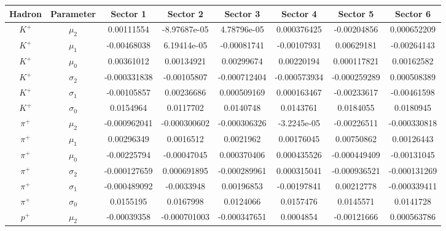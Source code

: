 \begin{landscape}
  \begin{table}
  \begin{tabular}{c|c|c|c|c|c|c|c}
    Hadron & Parameter & Sector 1 & Sector 2 & Sector 3 & Sector 4 & Sector 5 & Sector 6 \\
    \hline 
      $K^+$ & $\mu_2$ & 0.00111554 & -8.97687e-05 &        4.78796e-05 &        0.000376425 &        -0.00204856 &        0.000652209 \\
       $K^+$ & $\mu_1$ & -0.00468038 & 6.19414e-05 &        -0.00081741 &       -0.00107931 &         0.00629181 &        -0.00264143 \\
       $K^+$ & $\mu_0$ & 0.00361012 &         0.00134921 &         0.00299674 &         0.00220194 &        0.000117821 &         0.00162582 \\
    $K^+$ & $\sigma_2$ & -0.000331838 &        -0.00105807 &       -0.000712404 &       -0.000573934 &       -0.000259289 &        0.000508389 \\
    $K^+$ & $\sigma_1$ & -0.00105857 &         0.00236686 &        0.000509169 &        0.000163467 &        -0.00233617 &        -0.00461598 \\
    $K^+$ & $\sigma_0$ & 0.0154964 &           0.0117702 &          0.0140748 &          0.0143761 &          0.0184055 &         0.0180945 \\
      $\pi^+$ & $\mu_2$ & -0.000962041 &       -0.000300602 &       -0.000306326 &        -3.2245e-05 &        -0.00226511 &       -0.000330818 \\
      $\pi^+$ & $\mu_1$ & 0.00296349 &          0.0016512 &          0.0021962 &         0.00176045 &         0.00750862 &         0.00126443 \\
      $\pi^+$ & $\mu_0$ & -0.00225794 &        -0.00047045 &        0.000370406 &        0.000435526 &       -0.000449409 &        -0.00131045 \\
   $\pi^+$ & $\sigma_2$ & -0.000127659 &        0.000691895 &       -0.000289961 &        0.000315041 &       -0.000936521 &       -0.000131269 \\
   $\pi^+$ & $\sigma_1$ & -0.000489092 &         -0.0033948 &         0.00196853 &       -0.00197841 &         0.00212778 &       -0.000339411 \\
   $\pi^+$ & $\sigma_0$ & 0.0155195 &           0.0167998 &          0.0124066 &          0.0157476 &          0.0145571 &         0.0141728 \\
     $p^+$ & $\mu_2$ & -0.00039358 &       -0.000701003 &       -0.000347651 &          0.0004854 &        -0.00121666  &       0.000563786 \\

\end{tabular}
\end{table}
\end{landscape}
